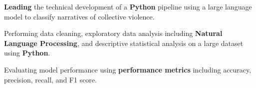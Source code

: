\begin{bullets}
	\item \textbf{Leading} the technical development of a \textbf{Python} pipeline using a large language model to classify narratives of collective violence.
	\item Performing data cleaning, exploratory data analysis including \textbf{Natural Language Processing}, and descriptive statistical analysis on a large dataset using \textbf{Python}.
	\item Evaluating model performance using \textbf{performance metrics} including accuracy, precision, recall, and F1 score.
\end{bullets}